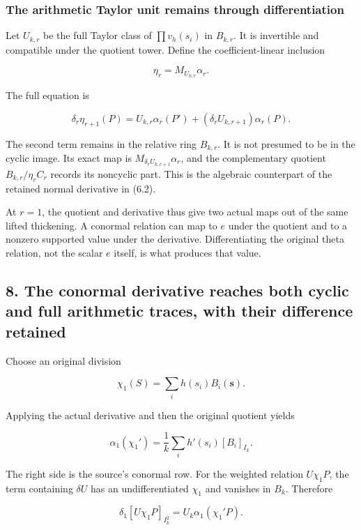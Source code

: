 \documentclass[
]{article}
\begin{document}
\subsubsection{The arithmetic Taylor unit remains through
differentiation}\label{the-arithmetic-taylor-unit-remains-through-differentiation}

Let \(U_{k,r}\) be the full Taylor class of \(\prod v_h(s_i)\) in
\(B_{k,r}\). It is invertible and compatible under the quotient tower.
Define the coefficient-linear inclusion

\[\eta_r=M_{U_{k,r}}\alpha_r.\]

The full equation is

\[\boxed{\delta_r\eta_{r+1}(P)
=U_{k,r}\alpha_r(P')+(\delta_rU_{k,r+1})\alpha_r(P).}\tag{7.11}\]

The second term remains in the relative ring \(B_{k,r}\). It is not
presumed to be in the cyclic image. Its exact map is
\(M_{\delta_rU_{k,r+1}}\alpha_r\), and the complementary quotient
\(B_{k,r}/\eta_rC_r\) records its noncyclic part. This is the algebraic
counterpart of the retained normal derivative in (6.2).

At \(r=1\), the quotient and derivative thus give two actual maps out of
the same lifted thickening. A conormal relation can map to \(e\) under
the quotient and to a nonzero supported value under the derivative.
Differentiating the original theta relation, not the scalar \(e\)
itself, is what produces that value.

\subsection{8. The conormal derivative reaches both cyclic and full
arithmetic traces, with their difference
retained}\label{the-conormal-derivative-reaches-both-cyclic-and-full-arithmetic-traces-with-their-difference-retained}

Choose an original division

\[\chi_1(S)=\sum_i h(s_i)B_i(\mathbf s).\]

Applying the actual derivative and then the original quotient yields

\[\boxed{\alpha_1(\chi_1')
=\frac1k\sum_i h'(s_i)[B_i]_{I_k}.}\tag{8.1}\]

The right side is the source's conormal row. For the weighted relation
\(U\chi_1P\), the term containing \(\delta U\) has an undifferentiated
\(\chi_1\) and vanishes in \(B_k\). Therefore

\[\boxed{\delta_1[U\chi_1P]_{I_k^2}
=U_k\alpha_1(\chi_1'P).}\tag{8.2}\]
\end{document}
